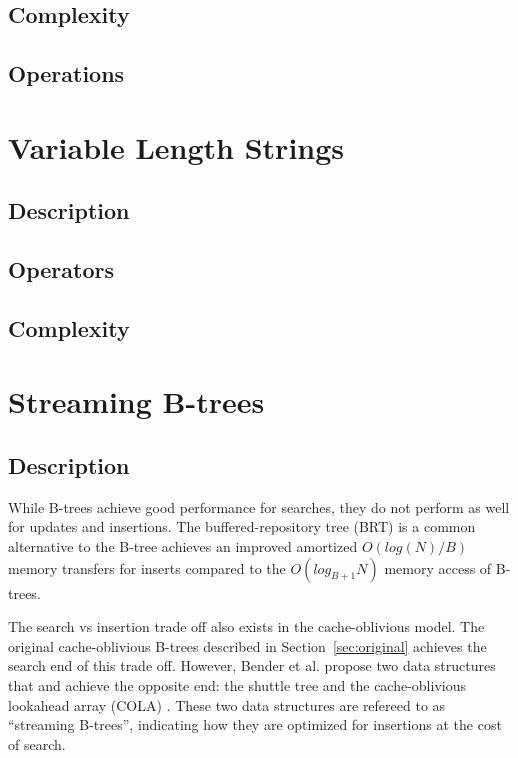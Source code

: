 \documentclass{style}
\begin{document}
\subsection{Complexity}

\subsection{Operations}

\section{Variable Length Strings}

\subsection{Description}

\subsection{Operators}

\subsection{Complexity}

\section{Streaming B-trees}

\subsection{Description}

While B-trees achieve good performance for searches, they do not perform as
well for updates and insertions. The buffered-repository tree (BRT) is a
common alternative to the B-tree achieves an improved amortized $O(log(N)/B)$
memory transfers for inserts compared to the $O(log_{B+1}N)$ memory access of
B-trees.

The search vs insertion trade off also exists in the cache-oblivious model.
The original cache-oblivious B-trees described in Section~\ref{sec:original}
achieves the search end of this trade off. However, Bender et al. propose two
data structures that and achieve the opposite end: the shuttle tree and the
cache-oblivious lookahead array (COLA) \cite{BenderFaFi07}. These two data
structures are refereed to as ``streaming B-trees'', indicating how they are
optimized for insertions at the cost of search.
\end{document}

